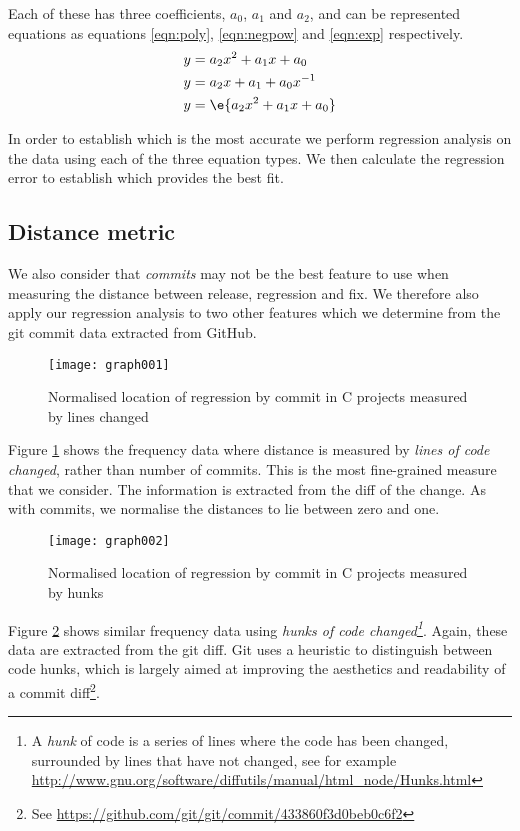\documentclass[10pt,journal,compsoc]{IEEEtran}
\begin{document}
Each of these has three coefficients, $a_0$, $a_1$ and $a_2$, and can be represented equations as equations \ref{eqn:poly}, \ref{eqn:negpow} and \ref{eqn:exp} respectively.
\begin{align}
y &= a_2 x^2 + a_1 x + a_0 \label{eqn:poly} \\
y &= a_2 x + a_1 + a_0 x^{-1} \label{eqn:negpow} \\
y &= \e{a_2 x^2 + a_1 x + a_0} \label{eqn:exp}
\end{align}

In order to establish which is the most accurate we perform regression analysis on the data using each of the three equation types. We then calculate the regression error to establish which provides the best fit.

\subsection{Distance metric}

We also consider that {\it commits\/} may not be the best feature to use when measuring the distance between release, regression and fix. We therefore also apply our regression analysis to two other features which we determine from the git commit data extracted from GitHub.

\begin{figure}[t]
\centering
\texttt{[image: graph001]}%
\caption{\label{fig:c-lines}Normalised location of regression by commit in C projects measured by lines changed}
\end{figure}

Figure \ref{fig:c-lines} shows the frequency data where distance is measured by {\it lines of code changed}, rather than number of commits. This is the most fine-grained measure that we consider. The information is extracted from the diff of the change. As with commits, we normalise the distances to lie between zero and one.

\begin{figure}[t]
\centering
\texttt{[image: graph002]}%
\caption{\label{fig:c-blocks}Normalised location of regression by commit in C projects measured by hunks}
\end{figure}

Figure \ref{fig:c-blocks} shows similar frequency data using {\it hunks of code changed\footnote{A {\it hunk\/} of code is a series of lines where the code has been changed, surrounded by lines that have not changed, see for example \url{http://www.gnu.org/software/diffutils/manual/html_node/Hunks.html}}}. Again, these data are extracted from the git diff. Git uses a heuristic to distinguish between code hunks, which is largely aimed at improving the aesthetics and readability of a commit diff\footnote{See \url{https://github.com/git/git/commit/433860f3d0beb0c6f2}}.
\end{document}
